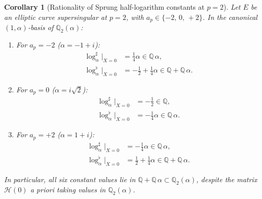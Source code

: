 \documentclass[11pt,a4paper]{amsart}
\newtheorem{corollary}[theorem]{Corollary}
\theoremstyle{definition}
\newcommand{\Q}{\mathbb{Q}}
\newcommand{\Hcal}{\mathcal{H}}
\begin{document}
\begin{corollary}[Rationality of Sprung half-logarithm constants at $p=2$]\label{cor:rationality}
Let $E$ be an elliptic curve supersingular at $p = 2$, with $a_p \in \{-2,\,0,\,+2\}$. In the canonical $(1, \alpha)$-basis of $\Q_2(\alpha)$:
\begin{enumerate}
\item[(i)] For $a_p = -2$ ($\alpha = -1+i$):
\begin{align}
\log_\alpha^\sharp\big|_{X=0} &= \tfrac{1}{4}\alpha \in \Q\,\alpha, \\
\log_\alpha^\flat\big|_{X=0} &= -\tfrac{1}{2} + \tfrac{1}{4}\alpha \in \Q + \Q\,\alpha.
\end{align}
\item[(ii)] For $a_p = 0$ ($\alpha = i\sqrt{2}$):
\begin{align}
\log_\alpha^\sharp\big|_{X=0} &= -\tfrac{1}{2} \in \Q, \\
\log_\alpha^\flat\big|_{X=0} &= -\tfrac{1}{4}\alpha \in \Q\,\alpha.
\end{align}
\item[(iii)] For $a_p = +2$ ($\alpha = 1+i$):
\begin{align}
\log_\alpha^\sharp\big|_{X=0} &= -\tfrac{1}{4}\alpha \in \Q\,\alpha, \\
\log_\alpha^\flat\big|_{X=0} &= \tfrac{1}{2} + \tfrac{1}{4}\alpha \in \Q + \Q\,\alpha.
\end{align}
\end{enumerate}
In particular, all six constant values lie in $\Q + \Q\,\alpha \subset \Q_2(\alpha)$, despite the matrix $\Hcal(0)$ a priori taking values in $\Q_2(\alpha)$.
\end{corollary}
\end{document}
